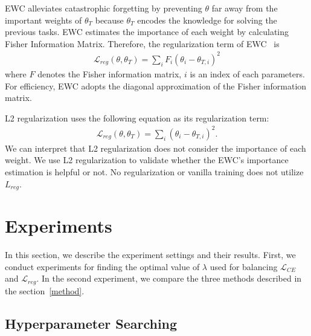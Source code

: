 \documentclass[final]{cvpr}
\begin{document}
EWC alleviates catastrophic forgetting by preventing $\theta$ far away from the important weights of $\theta_{T}$ because $\theta_{T}$ encodes the knowledge for solving the previous tasks. EWC estimates the importance of each weight by calculating Fisher Information Matrix. Therefore, the regularization term of EWC~\cite{ewc} is 
\begin{align}
	\mathcal{L}_{reg}(\theta, \theta_T) = \sum_i F_i(\theta_i - \theta_{T,i})^2
\end{align}
where $F$ denotes the Fisher information matrix, $i$ is an index of each parameters. For efficiency, EWC adopts the diagonal approximation of the Fisher information matrix.

L2 regularization uses the following equation as its regularization term:
\begin{align}
	\mathcal{L}_{reg}(\theta, \theta_T) = \sum_i(\theta_i - \theta_{T,i})^2.
\end{align}
We can interpret that L2 regularization does not consider the importance of each weight. We use L2 regularization to validate whether the EWC's importance estimation is helpful or not. No regularization or vanilla training does not utilize $L_{reg}$. 

\section{Experiments}
In this section, we describe the experiment settings and their results. First, we conduct experiments for finding the optimal value of $\lambda$ used for balancing $\mathcal{L}_{CE}$ and $\mathcal{L}_{reg}$. In the second experiment, we compare the three methods described in the section~\ref{method}.

\subsection{Hyperparameter Searching}
\end{document}
